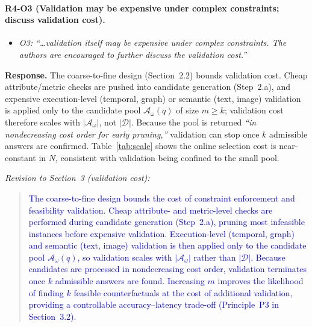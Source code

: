 \paragraph{R4-O3 (Validation may be expensive under complex constraints; discuss validation cost).}

\begin{itemize}[leftmargin=1.2em, itemsep=1pt, topsep=2pt]
\item \textit{O3: ``\dots validation itself may be expensive under complex constraints. The authors are encouraged to further discuss the validation cost.''}
\end{itemize}
\smallskip

\noindent\textbf{Response.}
The coarse-to-fine design (Section~2.2) bounds validation cost. Cheap attribute/metric checks are pushed into candidate generation (Step~2.a), and expensive execution-level (temporal, graph) or semantic (text, image) validation is applied only to the candidate pool $\mathcal{A}_\omega(q)$ of size $m\ge k$; validation cost therefore scales with $|\mathcal{A}_\omega|$, not $|\mathcal{D}|$. Because the pool is returned \emph{``in nondecreasing cost order for early pruning,''} validation can stop once $k$ admissible answers are confirmed. Table~\ref{tab:scale} shows the online selection cost is near-constant in $N$, consistent with validation being confined to the small pool.

\noindent\emph{Revision to Section~3 (validation cost):}
\begin{quote}
\textcolor{blue}{The coarse-to-fine design bounds the cost of constraint enforcement and feasibility validation. Cheap attribute- and metric-level checks are performed during candidate generation (Step~2.a), pruning most infeasible instances before expensive validation. Execution-level (temporal, graph) and semantic (text, image) validation is then applied only to the candidate pool $\mathcal A_\omega(q)$, so validation scales with $|\mathcal A_\omega|$ rather than $|\mathcal D|$. Because candidates are processed in nondecreasing cost order, validation terminates once $k$ admissible answers are found. Increasing $m$ improves the likelihood of finding $k$ feasible counterfactuals at the cost of additional validation, providing a controllable accuracy--latency trade-off (Principle~P3 in Section~3.2).}
\end{quote}
